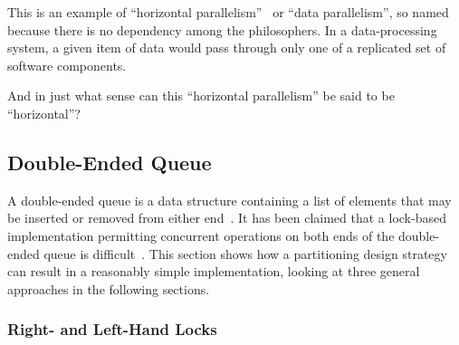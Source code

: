 This is an example of ``horizontal parallelism''~\cite{Inman85}
or ``data parallelism'',
so named because there is no dependency among the philosophers.
In a data-processing system, a given item of data
would pass through only one of a replicated set of software
components.

\QuickQuiz{}
	And in just what sense can this ``horizontal parallelism'' be
	said to be ``horizontal''?
 \QuickQuizEnd

\subsection{Double-Ended Queue}
\label{sec:SMPdesign:Double-Ended Queue}

A double-ended queue is a data structure containing a list of elements
that may be inserted or removed from either end~\cite{Knuth73}.
It has been claimed that a lock-based implementation permitting
concurrent operations on both ends of the double-ended queue is
difficult~\cite{DanGrossman2007TMGCAnalogy}.
This section shows how a partitioning design strategy can result
in a reasonably simple implementation, looking at three
general approaches in the following sections.

\subsubsection{Right- and Left-Hand Locks}
\label{sec:SMPdesign:Right- and Left-Hand Locks}

